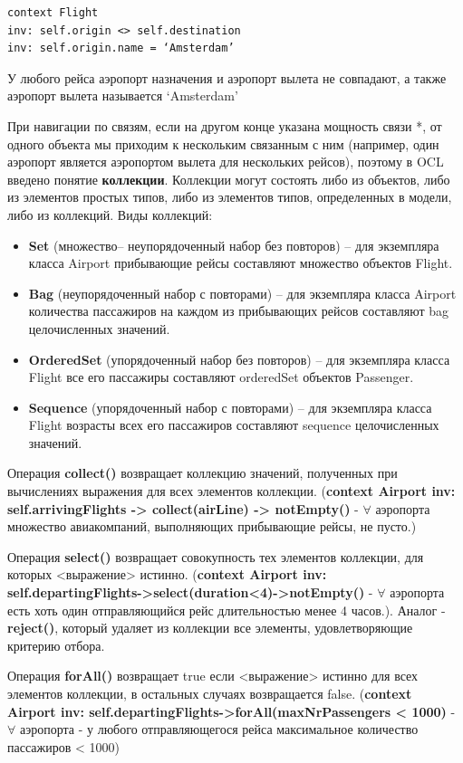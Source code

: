 \begin{verbatim}
context Flight
inv: self.origin <> self.destination
inv: self.origin.name = ‘Amsterdam’
\end{verbatim}

У любого рейса аэропорт назначения и аэропорт вылета не совпадают, а также аэропорт вылета называется ‘Amsterdam’

При навигации по связям, если на другом конце указана мощность связи *, от одного объекта мы приходим к нескольким связанным с ним (например, один аэропорт является аэропортом вылета для нескольких рейсов), поэтому в OCL введено понятие \textbf{коллекции}. Коллекции могут состоять либо из объектов, либо из элементов простых типов, либо из элементов типов, определенных в модели, либо из коллекций. Виды коллекций:
\begin{itemize}
    \item \textbf{Set} (множество– неупорядоченный набор без повторов) – для экземпляра класса Airport прибывающие рейсы составляют множество объектов Flight.
    \item \textbf{Bag} (неупорядоченный набор с повторами) – для экземпляра класса Airport количества пассажиров на каждом из прибывающих рейсов составляют bag целочисленных значений. 
    \item \textbf{OrderedSet} (упорядоченный набор без повторов) – для экземпляра класса Flight все его пассажиры составляют orderedSet объектов Passenger.
    \item \textbf{Sequence} (упорядоченный набор с повторами) – для экземпляра класса Flight возрасты всех его пассажиров составляют sequence целочисленных значений. 
\end{itemize}

Операция \textbf{collect()} возвращает коллекцию значений, полученных при вычислениях выражения
для всех элементов коллекции. (\textbf{context Airport inv: self.arrivingFlights -> collect(airLine) -> notEmpty()} - $\forall$ аэропорта множество авиакомпаний, выполняющих прибывающие рейсы, не пусто.)

Операция \textbf{select()} возвращает совокупность тех элементов коллекции, для которых <выражение>
истинно. (\textbf{context Airport inv: self.departingFlights->select(duration<4)->notEmpty()} - $\forall$ аэропорта есть хоть один отправляющийся рейс длительностью менее 4 часов.). Аналог - \textbf{reject()}, который удаляет из коллекции все элементы, удовлетворяющие критерию отбора.

Операция \textbf{forAll()} возвращает true если <выражение> истинно для всех элементов коллекции, в
остальных случаях возвращается false. (\textbf{context Airport inv: self.departingFlights->forAll(maxNrPassengers < 1000)} - $\forall$ аэропорта - у любого отправляющегося рейса максимальное количество пассажиров < 1000)

